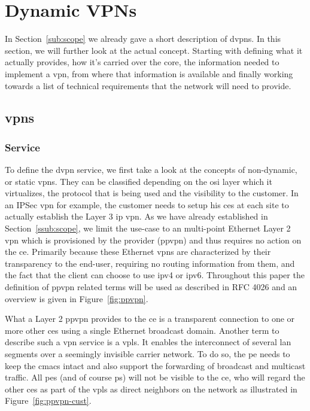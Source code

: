 \section{Dynamic VPNs} %
\label{sec:dvpns}

In Section~\ref{sub:scope} we already gave a short description of \acp{dvpn}. In this section, we will further look at the actual concept. Starting with defining what it actually provides, how it's carried over the core, the information needed to implement a \ac{vpn}, from where that information is available and finally working towards a list of technical requirements that the network will need to provide.

\subsection{\acsp{vpn}} %
\label{sub:vpn}

\subsubsection{Service} %
\label{ssub:service}

To define the \ac{dvpn} service, we first take a look at the concepts of non-dynamic, or static \acp{vpn}. They can be classified depending on the \acs{osi} layer which it virtualizes, the protocol that is being used and the visibility to the customer. In an IPSec \ac{vpn} for example, the customer needs to setup his \acp{ce} at each site to actually establish the Layer 3 \acs{ip} \ac{vpn}. As we have already established in Section~\ref{ssub:scope}, we limit the use-case to an multi-point Ethernet Layer 2 \ac{vpn} which is provisioned by the provider (\acs{ppvpn}) and thus requires no action on the \ac{ce}. Primarily because these Ethernet \acp{vpn} are characterized by their transparency to the end-user, requiring no routing information from them, and the fact that the client can choose to use \acs{ip}v4 or \acs{ip}v6. Throughout this paper the definition of \ac{ppvpn} related terms will be used as described in RFC 4026 \cite{vpn-terms} and an overview is given in Figure~\ref{fig:ppvpn}.

What a Layer 2 \ac{ppvpn} provides to the \ac{ce} is a transparent connection to one or more other \acp{ce} using a single Ethernet broadcast domain. Another term to describe such a \ac{vpn} service is a \ac{vpls}. It enables the interconnect of several \acs{lan} segments over a seemingly invisible carrier network. To do so, the \ac{pe} needs to keep the \acp{cmac} intact and also support the forwarding of broadcast and multicast traffic. All \acp{pe} (and of course \acp{p}) will not be visible to the \ac{ce}, who will regard the other \acp{ce} as part of the \ac{vpls} as direct neighbors on the network as illustrated in Figure~\ref{fig:ppvpn-cust}. 

